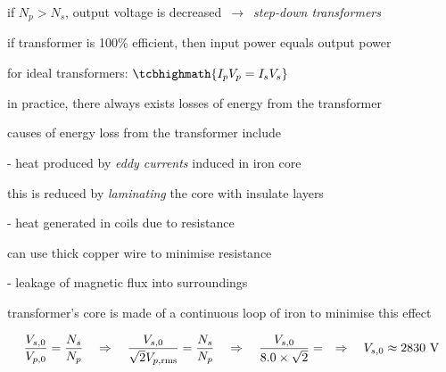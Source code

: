 if $N_p > N_s$, output voltage is decreased $\,\rightarrow\,$ \emph{step-down transformers}

\cmt if transformer is 100\% efficient, then input power equals output power

for ideal transformers: $\tcbhighmath{I_p V_p  = I_s V_s} $

\cmt in practice, there always exists losses of energy from the transformer

causes of energy loss from the transformer include

\begin{compactitem}
\item[-] heat produced by \emph{eddy currents} induced in iron core

this is reduced by \emph{laminating} the core with insulate layers

\item[-] heat generated in coils due to resistance

can use thick copper wire to minimise resistance

\item[-] leakage of magnetic flux into surroundings

transformer's core is made of a continuous loop of iron to minimise this effect

\end{compactitem}


\begin{soln}\begin{equation*}
\frac{V_{s,0}}{V_{p,0}} = \frac{N_s}{N_p} \quad \Rightarrow \quad 
\frac{V_{s,0}}{\sqrt{2}V_{p,\text{rms}}} = \frac{N_s}{N_p} \quad \Rightarrow \quad
\frac{V_{s,0}}{8.0\times\sqrt{2}} = \quad \Rightarrow \quad
V_{s,0} \approx 2830 \text{ V}   
\end{equation*}
\end{soln}




